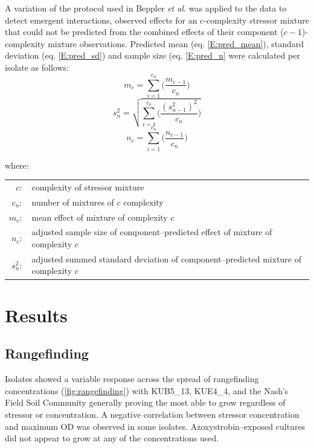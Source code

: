 \documentclass[10pt]{article}
\begin{document}
A variation of the protocol used in Beppler \textit{et al.} \cite{Beppler2016} was applied to the data to detect emergent interactions, observed effects for an c-complexity stressor mixture that could not be predicted from the combined effects of their component ($c-1$)-complexity mixture observations. Predicted mean (eq. \ref{E:pred_mean}), standard deviation (eq. \ref{E:pred_sd}) and sample size (eq. \ref{E:pred_n} were calculated per isolate as follows: 
\begin{equation}
    m_c = \sum_{i = 1}^{c_n}\Big(\frac{m_{c-1}}{c_n}\Big)
\label{E:pred_mean}    
\end{equation}
\begin{equation}
    s^2_n = \sqrt{\sum_{i = 1}^{c_n}\bigg(\frac{(s^2_{n-1})^2}{c_n}\bigg)}
\label{E:pred_sd}    
\end{equation}
\begin{equation}
    n_c = \sum_{i = 1}^{c_n}\Big(\frac{n_{c-1}}{c_n}\Big)
\label{E:pred_n}    
\end{equation}

\mbox{where:}

\begin{small}
\setlength{\tabcolsep}{1pt}
\begin{tabular}{r p{11cm}}
    $c :$       & complexity of stressor mixture \\
    $c_n :$     & number of mixtures of $c$ complexity \\
    $m_c :$     & mean effect of mixture of complexity $c$ \\
    $n_c :$     & adjusted sample size of component--predicted effect of mixture of complexity $c$ \\
    $s^2_n :$   & adjusted summed standard deviation of component--predicted mixture of complexity $c$ \\
\end{tabular}
\end{small}

\section{Results}
\label{S:3}

\subsection{Rangefinding}
\label{S:3:1}

Isolates showed a variable response across the spread of rangefinding concentrations (\cref{fig:rangefinding}) with KUB5\_13, KUE4\_4, and the Nash's Field Soil Community generally proving the most able to grow regardless of stressor or concentration. A negative correlation between stressor concentration and maximum OD was observed in some isolates. Azoxystrobin--exposed cultures did not appear to grow at any of the concentrations used.
\end{document}
